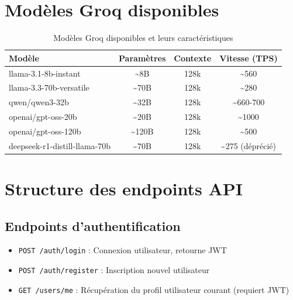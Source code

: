 \section{Modèles Groq disponibles}

\begin{table}[h]
\centering
\begin{tabular}{|l|c|c|c|}
\hline
\textbf{Modèle} & \textbf{Paramètres} & \textbf{Contexte} & \textbf{Vitesse (TPS)} \\
\hline
llama-3.1-8b-instant & \textasciitilde{}8B & 128k & \textasciitilde{}560 \\
\hline
llama-3.3-70b-versatile & \textasciitilde{}70B & 128k & \textasciitilde{}280 \\
\hline
qwen/qwen3-32b & \textasciitilde{}32B & 128k & \textasciitilde{}660-700 \\
\hline
openai/gpt-oss-20b & \textasciitilde{}20B & 128k & \textasciitilde{}1000 \\
\hline
openai/gpt-oss-120b & \textasciitilde{}120B & 128k & \textasciitilde{}500 \\
\hline
deepseek-r1-distill-llama-70b & \textasciitilde{}70B & 128k & \textasciitilde{}275 (déprécié) \\
\hline
\end{tabular}
\caption{Modèles Groq disponibles et leurs caractéristiques}
\end{table}

\section{Structure des endpoints API}

\subsection{Endpoints d'authentification}
\begin{itemize}
    \item \texttt{POST /auth/login} : Connexion utilisateur, retourne JWT
    \item \texttt{POST /auth/register} : Inscription nouvel utilisateur
    \item \texttt{GET /users/me} : Récupération du profil utilisateur courant (requiert JWT)
\end{itemize}

